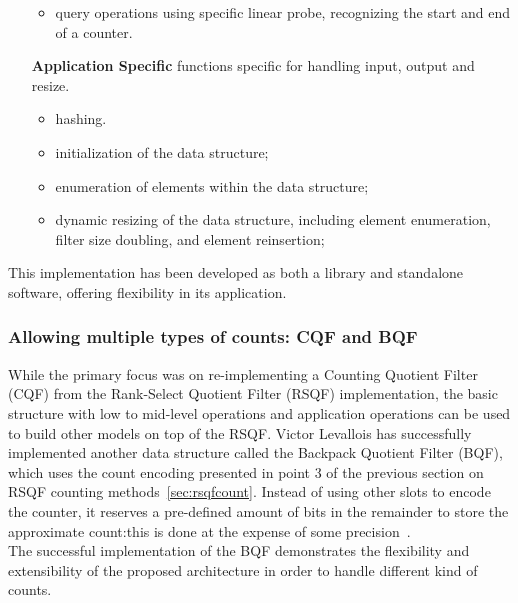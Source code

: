\begin{itemize}
\begin{itemize}
		\item query operations using specific linear probe, recognizing the start and end of a counter.
	\end{itemize}
	\item[\textbf{Application Specific}] functions specific for handling input, output and resize.
	\begin{itemize}
		\item \kmer hashing.
		\item initialization of the data structure;
		\item enumeration of elements within the data structure;
		\item dynamic resizing of the data structure, including element enumeration, filter size doubling, and element reinsertion;
	\end{itemize} 
\end{itemize}
This implementation has been developed as both a library and standalone software, offering flexibility in its application.
\subsubsection{Allowing multiple types of counts: CQF and BQF}
While the primary focus was on re-implementing a Counting Quotient Filter (CQF) from the Rank-Select Quotient Filter (RSQF) implementation, the basic structure with low to mid-level operations and application operations can be used to build other models on top of the RSQF. Victor Levallois has successfully implemented another data structure called the Backpack Quotient Filter (BQF), which uses the count encoding presented in point 3 of the previous section on RSQF counting methods~\ref{sec:rsqfcount}. Instead of using other slots to encode the counter, it reserves a pre-defined amount of bits in the remainder to store the approximate count:this is done at the expense of some precision~\cite{bqf}.\\
The successful implementation of the BQF demonstrates the flexibility and extensibility of the proposed architecture in order to handle different kind of counts.

